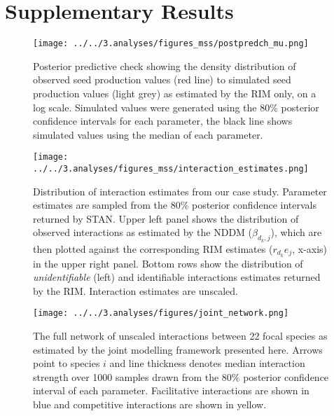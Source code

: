 \section{Supplementary Results}
\label{SI:results}


    \begin{figure}[H]
        \texttt{[image: ../../3.analyses/figures\_mss/postpredch\_mu.png]}
        \caption{Posterior predictive check showing the density distribution of observed seed production values (red line) to simulated seed production values (light grey) as estimated by the RIM only, on a log scale. Simulated values were generated using the 80\% posterior confidence intervals for each parameter, the black line shows simulated values using the median of each parameter. }
        \label{fig:ppcheckmu1}
    \end{figure}

    \begin{figure}[H]
        \texttt{[image: ../../3.analyses/figures\_mss/interaction\_estimates.png]}
        \caption{Distribution of interaction estimates from our case study. Parameter estimates are sampled from the 80\% posterior confidence intervals returned by STAN. Upper left panel shows the distribution of observed interactions as estimated by the NDDM ($\beta_{d_k, j}$), which are then plotted against the corresponding RIM estimates ($r_{d_k} e_j$, x-axis) in the upper right panel. Bottom rows show the distribution of \textit{unidentifiable} (left) and identifiable interactions estimates returned by the RIM. Interaction estimates are unscaled.}
        \label{fig:adist}
    \end{figure}


    \begin{figure}[H]
        \texttt{[image: ../../3.analyses/figures/joint\_network.png]}
        \caption{The full network of unscaled interactions between 22 focal species as estimated by the joint modelling framework presented here. Arrows point to species $i$ and line thickness denotes median interaction strength over 1000 samples drawn from the 80\% posterior confidence interval of each parameter. Facilitative interactions are shown in blue and competitive interactions are shown in yellow.}
        \label{fig:jointnetwork}
    \end{figure}

